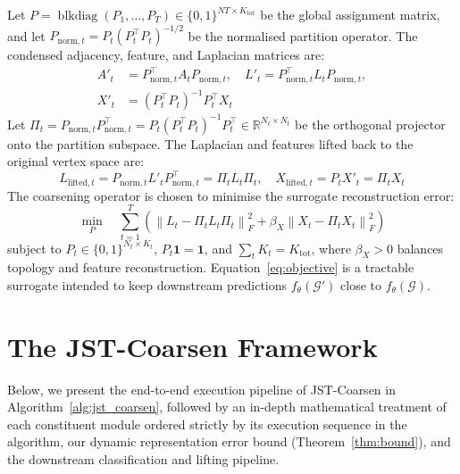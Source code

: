 \documentclass[sigconf]{acmart}
\begin{document}
Let $P = \operatorname{blkdiag}(P_1, \dots, P_T) \in \{0, 1\}^{NT \times K_{\text{tot}}}$ be the global assignment matrix, and let $P_{\text{norm}, t} = P_t (P_t^\top P_t)^{-1/2}$ be the normalised partition operator. The condensed adjacency, feature, and Laplacian matrices are:
\begin{equation}
\label{eq:coarsened_ops}
\begin{split}
A'_t &= P_{\text{norm}, t}^\top A_t P_{\text{norm}, t}, \quad L'_t = P_{\text{norm}, t}^\top L_t P_{\text{norm}, t}, \\
X'_t &= (P_t^\top P_t)^{-1} P_t^\top X_t
\end{split}
\end{equation}
Let $\Pi_t = P_{\text{norm}, t} P_{\text{norm}, t}^\top = P_t (P_t^\top P_t)^{-1} P_t^\top \in \mathbb{R}^{N_t \times N_t}$ be the orthogonal projector onto the partition subspace. The Laplacian and features lifted back to the original vertex space are:
\begin{equation}
\label{eq:lifted_ops}
L_{\text{lifted}, t} = P_{\text{norm}, t} L'_t P_{\text{norm}, t}^\top = \Pi_t L_t \Pi_t, \quad X_{\text{lifted}, t} = P_t X'_t = \Pi_t X_t
\end{equation}
The coarsening operator is chosen to minimise the surrogate reconstruction error:
\begin{equation}
\label{eq:objective}
\min_{P} \quad \sum_{t=1}^T \left( \left\| L_t - \Pi_t L_t \Pi_t \right\|_F^2 + \beta_X \left\| X_t - \Pi_t X_t \right\|_F^2 \right)
\end{equation}
subject to $P_t \in \{0, 1\}^{N_t \times K_t}$, $P_t \mathbf{1} = \mathbf{1}$, and $\sum_t K_t = K_{\text{tot}}$, where $\beta_X > 0$ balances topology and feature reconstruction. Equation~\eqref{eq:objective} is a tractable surrogate intended to keep downstream predictions $f_\theta(\mathcal{G}')$ close to $f_\theta(\mathcal{G})$.

\section{The JST-Coarsen Framework}
\label{sec:methodology}
Below, we present the end-to-end execution pipeline of JST-Coarsen in Algorithm~\ref{alg:jst_coarsen}, followed by an in-depth mathematical treatment of each constituent module ordered strictly by its execution sequence in the algorithm, our dynamic representation error bound (Theorem~\ref{thm:bound}), and the downstream classification and lifting pipeline.
\end{document}
